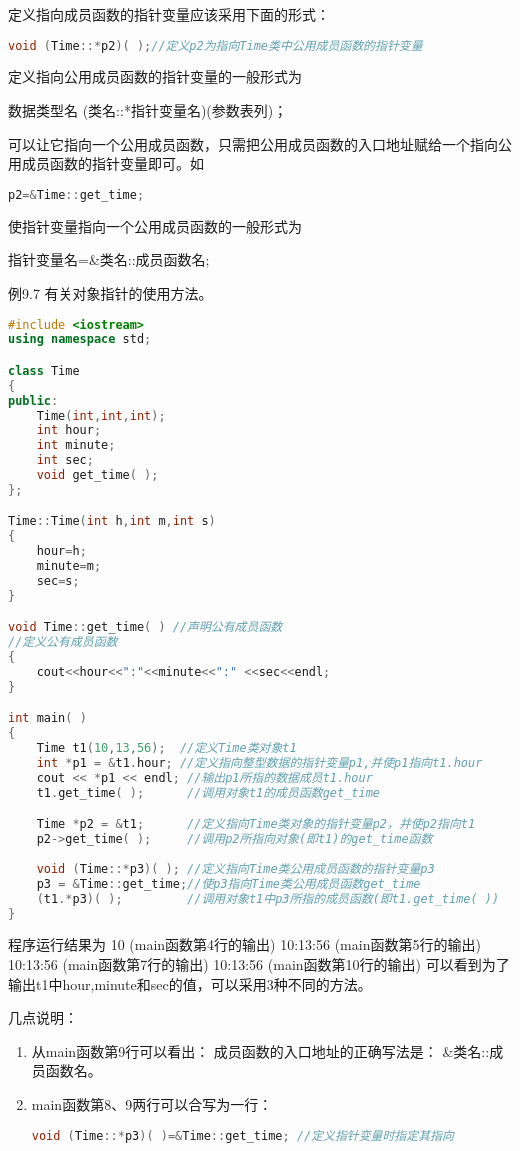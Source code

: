 \documentclass{article}
\begin{document}
\begin{CJK}{UTF8}{gbsn}
\begin{enumerate}
  定义指向成员函数的指针变量应该采用下面的形式：
\begin{lstlisting}[language=c++]
    void (Time::*p2)( );//定义p2为指向Time类中公用成员函数的指针变量
\end{lstlisting}
  
  定义指向公用成员函数的指针变量的一般形式为
  
  数据类型名 (类名::*指针变量名)(参数表列)；

  可以让它指向一个公用成员函数，只需把公用成员函数的入口地址赋给一个指向公用成员函数的指针变量即可。如
\begin{lstlisting}[language=c++]
    p2=&Time::get_time;
\end{lstlisting}
  使指针变量指向一个公用成员函数的一般形式为
  
  指针变量名=\&类名::成员函数名;
  
  例9.7 有关对象指针的使用方法。
\begin{lstlisting}[language=c++]
#include <iostream>
using namespace std;

class Time
{
public:
    Time(int,int,int);
    int hour;
    int minute;
    int sec;
    void get_time( );
};

Time::Time(int h,int m,int s)
{
    hour=h;
    minute=m;
    sec=s;
}

void Time::get_time( ) //声明公有成员函数
//定义公有成员函数
{
    cout<<hour<<":"<<minute<<":" <<sec<<endl;
}

int main( )
{
    Time t1(10,13,56);  //定义Time类对象t1
    int *p1 = &t1.hour; //定义指向整型数据的指针变量p1,并使p1指向t1.hour
    cout << *p1 << endl; //输出p1所指的数据成员t1.hour
    t1.get_time( );      //调用对象t1的成员函数get_time

    Time *p2 = &t1;      //定义指向Time类对象的指针变量p2，并使p2指向t1
    p2->get_time( );     //调用p2所指向对象(即t1)的get_time函数
    
    void (Time::*p3)( ); //定义指向Time类公用成员函数的指针变量p3
    p3 = &Time::get_time;//使p3指向Time类公用成员函数get_time
    (t1.*p3)( );         //调用对象t1中p3所指的成员函数(即t1.get_time( ))
}
\end{lstlisting}

   程序运行结果为
   10 (main函数第4行的输出)
   10:13:56 (main函数第5行的输出)
   10:13:56 (main函数第7行的输出)
   10:13:56 (main函数第10行的输出)
   可以看到为了输出t1中hour,minute和sec的值，可以采用3种不同的方法。
 \end{enumerate}

 几点说明：
 \begin{enumerate}
   \itemsep=-3pt
 \item 从main函数第9行可以看出： 成员函数的入口地址的正确写法是： \&类名::成员函数名。
 \item main函数第8、9两行可以合写为一行：
\begin{lstlisting}[language=c++]
    void (Time::*p3)( )=&Time::get_time; //定义指针变量时指定其指向
\end{lstlisting}
 \end{enumerate}



\end{CJK}
\end{document}
